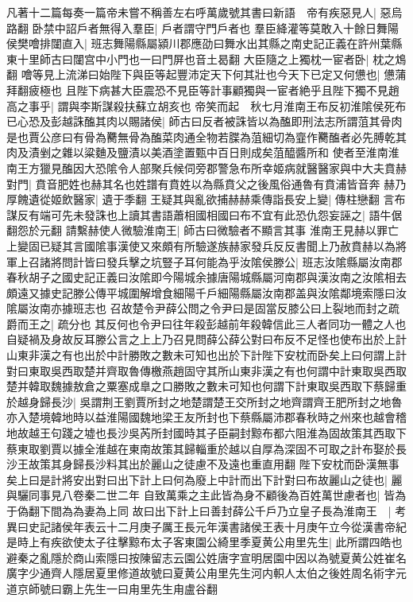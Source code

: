 凡著十二篇每奏一篇帝未嘗不稱善左右呼萬歲號其書曰新語　帝有疾惡見人|{
	惡烏路翻}
卧禁中詔戶者無得入羣臣|{
	戶者謂守門戶者也}
羣臣絳灌等莫敢入十餘日舞陽侯樊噲排闥直入|{
	班志舞陽縣屬潁川郡應劭曰舞水出其縣之南史記正義在許州葉縣東十里師古曰闥宫中小門也一曰門屏也音土曷翻}
大臣隨之上獨枕一宦者卧|{
	枕之鴆翻}
噲等見上流涕曰始陛下與臣等起豐沛定天下何其壯也今天下已定又何憊也|{
	憊蒲拜翻疲極也}
且陛下病甚大臣震恐不見臣等計事顧獨與一宦者絶乎且陛下獨不見趙高之事乎|{
	謂與李斯謀殺扶蘇立胡亥也}
帝笑而起　秋七月淮南王布反初淮隂侯死布已心恐及彭越誅醢其肉以賜諸侯|{
	師古曰反者被誅皆以為醢即刑法志所謂菹其骨肉是也賈公彦曰有骨為臡無骨為醢菜肉通全物若䐑為菹細切為韲作臡醢者必先膊乾其肉及漬剉之雜以粱麯及鹽漬以美酒塗置甄中百日則成矣菹醯醬所和}
使者至淮南淮南王方獵見醢因大恐隂令人部聚兵候伺旁郡警急布所幸姬病就醫醫家與中大夫賁赫對門|{
	賁音肥姓也赫其名也姓譜有賁姓以為縣賁父之後風俗通魯有賁浦皆音奔}
赫乃厚餽遺從姬飲醫家|{
	遺于季翻}
王疑其與亂欲捕赫赫乘傳詣長安上變|{
	傳柱戀翻}
言布謀反有端可先未發誅也上讀其書語蕭相國相國曰布不宜有此恐仇怨妄誣之|{
	語牛倨翻怨於元翻}
請繫赫使人微驗淮南王|{
	師古曰微驗者不顯言其事}
淮南王見赫以罪亡上變固已疑其言國隂事漢使又來頗有所驗遂族赫家發兵反反書聞上乃赦賁赫以為將軍上召諸將問計皆曰發兵擊之坑豎子耳何能為乎汝隂侯滕公|{
	班志汝隂縣屬汝南郡春秋胡子之國史記正義曰汝隂即今陽城余據唐陽城縣屬河南郡與漢汝南之汝隂相去頗遠又據史記滕公傳平城圍解增食細陽千戶細陽縣屬汝南郡盖與汝隂鄰境索隱曰汝隂屬汝南亦據班志也}
召故楚令尹薛公問之令尹曰是固當反膝公曰上裂地而封之疏爵而王之|{
	疏分也}
其反何也令尹曰往年殺彭越前年殺韓信此三人者同功一體之人也自疑禍及身故反耳滕公言之上上乃召見問薛公薛公對曰布反不足怪也使布出於上計山東非漢之有也出於中計勝敗之數未可知也出於下計陛下安枕而卧矣上曰何謂上計對曰東取吳西取楚并齊取魯傳檄燕趙固守其所山東非漢之有也何謂中計東取吳西取楚并韓取魏據敖倉之粟塞成臯之口勝敗之數未可知也何謂下計東取吳西取下蔡歸重於越身歸長沙|{
	吳謂荆王劉賈所封之地楚謂楚王交所封之地齊謂齊王肥所封之地魯亦入楚境韓地時以益淮陽國魏地梁王友所封也下蔡縣屬沛郡春秋時之州來也越會稽地故越王句踐之墟也長沙吳芮所封國時其子臣嗣封黥布都六阻淮為固故策其西取下蔡東取劉賈以據全淮越在東南故策其歸輜重於越以自厚為深固不可取之計布娶於長沙王故策其身歸長沙料其出於麗山之徒慮不及遠也重直用翻}
陛下安枕而卧漢無事矣上曰是計將安出對曰出下計上曰何為廢上中計而出下計對曰布故麗山之徒也|{
	麗與驪同事見八卷秦二世二年}
自致萬乘之主此皆為身不顧後為百姓萬世慮者也|{
	皆為于偽翻下間為為妻為上同}
故曰出下計上曰善封薛公千戶乃立皇子長為淮南王　|{
	考異曰史記諸侯年表云十二月庚子厲王長元年漢書諸侯王表十月庚午立今從漢書帝紀}
是時上有疾欲使太子往擊黥布太子客東園公綺里季夏黄公甪里先生|{
	此所謂四皓也避秦之亂隱於商山索隱曰按陳留志云園公姓唐字宣明居園中因以為號夏黄公姓崔名廣字少通齊人隱居夏里修道故號曰夏黄公甪里先生河内軹人太伯之後姓周名術字元道京師號曰霸上先生一曰甪里先生甪盧谷翻}
